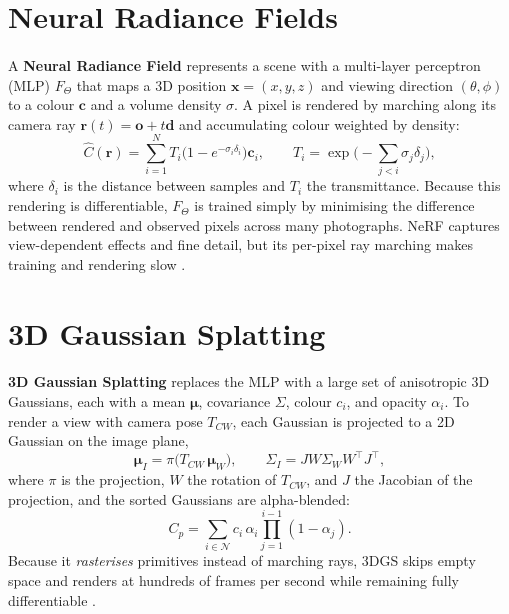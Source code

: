 \documentclass[12pt,a4paper,final]{extreport}
\begin{document}
\section{Neural Radiance Fields}

\paragraph{} A \textbf{Neural Radiance Field} \cite{mildenhall2020} represents a scene with a multi-layer perceptron (MLP) $F_\Theta$ that maps a 3D position $\mathbf{x}=(x,y,z)$ and viewing direction $(\theta,\phi)$ to a colour $\mathbf{c}$ and a volume density $\sigma$. A pixel is rendered by marching along its camera ray $\mathbf{r}(t)=\mathbf{o}+t\mathbf{d}$ and accumulating colour weighted by density:
\begin{equation}
\hat{C}(\mathbf{r})=\sum_{i=1}^{N}T_i\big(1-e^{-\sigma_i\delta_i}\big)\mathbf{c}_i,\qquad T_i=\exp\Big(-\sum_{j<i}\sigma_j\delta_j\Big),
\end{equation}
where $\delta_i$ is the distance between samples and $T_i$ the transmittance. Because this rendering is differentiable, $F_\Theta$ is trained simply by minimising the difference between rendered and observed pixels across many photographs. NeRF captures view-dependent effects and fine detail, but its per-pixel ray marching makes training and rendering slow \cite{p3}.

\section{3D Gaussian Splatting}

\paragraph{} \textbf{3D Gaussian Splatting} \cite{kerbl2023} replaces the MLP with a large set of anisotropic 3D Gaussians, each with a mean $\boldsymbol{\mu}$, covariance $\Sigma$, colour $c_i$, and opacity $\alpha_i$. To render a view with camera pose $T_{CW}$, each Gaussian is projected to a 2D Gaussian on the image plane,
\begin{equation}
\boldsymbol{\mu}_I=\pi\big(T_{CW}\,\boldsymbol{\mu}_W\big),\qquad \Sigma_I=JW\Sigma_WW^{\top}J^{\top},
\end{equation}
where $\pi$ is the projection, $W$ the rotation of $T_{CW}$, and $J$ the Jacobian of the projection, and the sorted Gaussians are alpha-blended:
\begin{equation}
C_p=\sum_{i\in\mathcal{N}}c_i\,\alpha_i\prod_{j=1}^{i-1}(1-\alpha_j).
\end{equation}
Because it \emph{rasterises} primitives instead of marching rays, 3DGS skips empty space and renders at hundreds of frames per second while remaining fully differentiable \cite{p3}.
\end{document}
